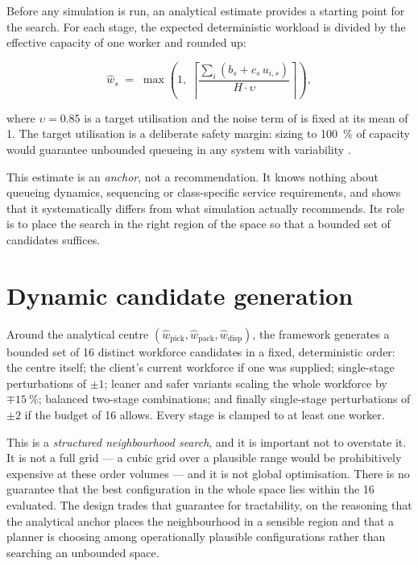 Before any simulation is run, an analytical estimate provides a starting point for the search.
For each stage, the expected deterministic workload is divided by the effective capacity of one
worker and rounded up:

\begin{equation}
\hat{w}_s \;=\; \max\!\left(1,\; \left\lceil
\frac{\sum_i \left(b_s + c_s\, u_{i,s}\right)}{H \cdot \upsilon}
\right\rceil\right),
\label{eq:capacity-estimate}
\end{equation}

\noindent where \(\upsilon = 0.85\) is a target utilisation and the noise term of
 is fixed at its mean of \num{1}. The target utilisation is a deliberate
safety margin: sizing to \SI{100}{\percent} of capacity would guarantee unbounded queueing in
any system with variability \citep{hopp2011}.

This estimate is an \emph{anchor}, not a recommendation. It knows nothing about queueing
dynamics, sequencing or class-specific service requirements, and  shows
that it systematically differs from what simulation actually recommends. Its role is to place
the search in the right region of the space so that a bounded set of candidates suffices.

\section{Dynamic candidate generation}
\label{sec:candidates}

Around the analytical centre \((\hat{w}_{\text{pick}}, \hat{w}_{\text{pack}},
\hat{w}_{\text{disp}})\), the framework generates a bounded set of 16 distinct workforce
candidates in a fixed, deterministic order: the centre itself; the client's current workforce
if one was supplied; single-stage perturbations of \(\pm 1\); leaner and safer variants scaling
the whole workforce by \(\mp\SI{15}{\percent}\); balanced two-stage combinations; and finally
single-stage perturbations of \(\pm 2\) if the budget of 16 allows. Every stage is clamped to at
least one worker.

This is a \emph{structured neighbourhood search}, and it is important not to overstate it. It
is not a full grid --- a cubic grid over a plausible range would be prohibitively expensive at
these order volumes --- and it is not global optimisation. There is no guarantee that the best
configuration in the whole space lies within the 16 evaluated. The design trades that guarantee
for tractability, on the reasoning that the analytical anchor places the neighbourhood in a
sensible region and that a planner is choosing among operationally plausible configurations
rather than searching an unbounded space.

